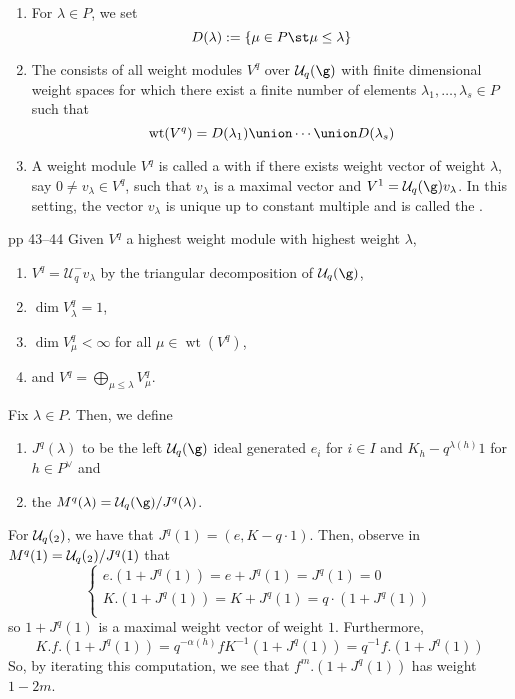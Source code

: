 \documentclass[11pt,leqno,oneside]{amsart}
\numberwithin{thm}{section}
\newcommand{\weightlattice}{P}
\newcommand{\U}{\mathcal{U}}
\DeclareMathOperator{\wt}{wt}
\begin{document}
\begin{defn}
  \begin{enumerate}
  \item For \(\lambda \in \weightlattice\), we set \[
      D(\lambda) := \{\mu \in \weightlattice \st \mu \leq \lambda\}
    \]
  \item The  consists of all weight modules
    \(V^q\) over \(\U_q(\g)\) with finite dimensional weight spaces
    for which there exist a finite number of elements \(\lambda_1,
    \ldots, \lambda_s \in \weightlattice\) such that \[
      \wt(V^q) = D(\lambda_1) \union \cdots \union D(\lambda_s)
    \]
  \item A weight module \(V^q\) is called a 
    with  if there exists weight vector
    of weight \(\lambda\), say \(0 \neq
    v_\lambda \in V^q\), such that \(v_\lambda\) is a maximal vector
    and \(V^1 = \U_q(\g) v_\lambda\). In this setting, the vector
    \(v_\lambda\) is unique up to constant multiple and is called the
    .
  \end{enumerate}
\end{defn}
\begin{prop}
  \cite{hong-kang}{pp 43--44} Given \(V^q\) a highest weight module
  with highest weight 
  \(\lambda\),
  \begin{enumerate}
  \item \(V^q = \U_q^- v_\lambda\) by the triangular decomposition of
    \(\U_q(\g)\),
  \item \(\dim V^q_\lambda = 1\),
  \item \(\dim V^q_\mu < \infty\) for all \(\mu \in \wt(V^q)\),
  \item and \(V^q = \bigoplus_{\mu \leq \lambda} V^q_\mu\).
  \end{enumerate}
\end{prop}
\begin{defn}
  Fix \(\lambda \in \weightlattice\). Then, we define
  \begin{enumerate}
  \item \(J^q(\lambda)\) to be the left \(\U_q(\g)\) ideal generated
    \(e_i\) for \(i \in I\) and \(K_h - q^{\lambda(h)}1\) for \(h \in
    \weightlattice^\vee\) and
  \item the  \(M^q(\lambda) = \U_q(\g)/J^q(\lambda)\).
  \end{enumerate}
\end{defn}
\begin{example}
  For \(\U_q(\sl_2)\), we have that \(J^q(1) = (e, K-q\cdot
  1)\). Then, observe in \(M^q(1) = \U_q(\sl_2)/J^q(1)\) that \[
    \begin{cases}
      e.(1+J^q(1)) = e+J^q(1) = J^q(1) = 0 \\
      K.(1+J^q(1)) = K+J^q(1) = q \cdot (1 + J^q(1)) \\
    \end{cases}
  \]
  so \(1+J^q(1)\) is a maximal weight vector of weight
  \(1\). Furthermore, \[
    K.f.(1+J^q(1)) = q^{-\alpha(h)} f K^{-1} (1+J^q(1)) = q^{-1}
    f.(1+J^q(1)) 
  \]
  So, by iterating this computation, we see that \(f^m.(1+J^q(1))\)
  has weight \(1-2m\).
\end{example}
\end{document}
